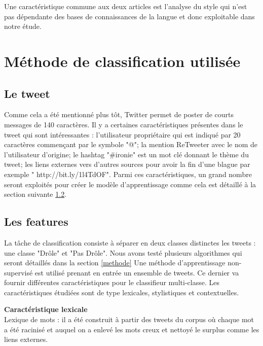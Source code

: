 \documentclass[10pt,a4paper,twoside]{article}
\begin{document}
Une caractéristique commune aux deux articles est l’analyse du style qui n’est pas dépendante des bases de connaissances de la langue et donc exploitable dans notre étude.

\section{Méthode de classification utilisée}
\label{methClass}
\subsection{Le tweet} 
Comme cela a été mentionné plus tôt, Twitter permet de poster de courts messages de 140 caractères. Il y a certaines caractéristiques présentes dans le tweet qui sont intéressantes : l'utilisateur propriétaire qui est indiqué par 20 caractères commençant par le symbole "@"; la mention ReTweeter avec le nom de l'utilisateur d'origine; le hashtag "\#ironie" est un mot clé donnant le thème du tweet; les liens externes vers d'autres sources pour avoir la fin d'une blague par exemple " http://bit.ly/1l4TdOF". Parmi ces caractéristiques, un grand nombre seront exploités pour créer le modèle d'apprentissage comme cela est détaillé à la section suivante \ref{features}.


\subsection{Les features}
\label{features}
La tâche de classification consiste à séparer en deux classes distinctes les tweets : une classe "Drôle" et "Pas Drôle". Nous avons testé plusieurs algorithmes qui seront détaillés dans la section \ref{methode}
Une méthode d'apprentissage non-supervisé est utilisé prenant en entrée un ensemble de tweets. Ce dernier va fournir différentes caractéristiques pour le classifieur multi-classe. Les caractéristiques étudiées sont de type lexicales, stylistiques et contextuelles. 

\textbf{Caractéristique lexicale}\\
Lexique de mots : il a été construit à partir des tweets du corpus où chaque mot a été racinisé et auquel on a enlevé les mots creux et nettoyé le surplus comme les liens externes.
\vspace{0.5cm}
\end{document}
